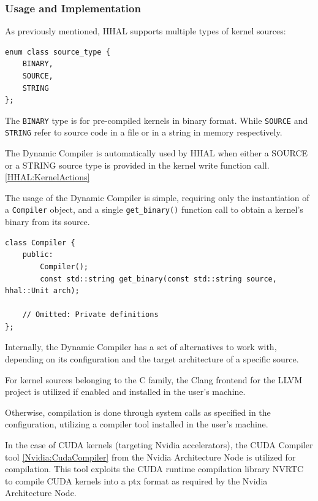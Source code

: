 \subsubsection{Usage and Implementation}

As previously mentioned, HHAL supports multiple types of kernel sources: 

\begin{lstlisting}[style=CStyle, caption=HHAL API - Kernel source types]
enum class source_type {
    BINARY,
    SOURCE,
    STRING
};
\end{lstlisting}

The \texttt{BINARY} type is for pre-compiled kernels in binary format. While \texttt{SOURCE} and \texttt{STRING} refer to source code in a file or in a string in memory respectively.

The Dynamic Compiler is automatically used by HHAL when either a SOURCE or a STRING source type is provided in the kernel write function call. \ref{HHAL:KernelActions}

The usage of the Dynamic Compiler is simple, requiring only the instantiation of a \texttt{Compiler} object, and a single \texttt{get\_binary()} function call to obtain a kernel's binary from its source.

\begin{lstlisting}[style=CStyle, caption=HHAL Dynamic Compiler - Compiler class]
class Compiler {
    public:
        Compiler();
        const std::string get_binary(const std::string source, hhal::Unit arch);

    // Omitted: Private definitions
};
\end{lstlisting}

Internally, the Dynamic Compiler has a set of alternatives to work with, depending on its configuration and the target architecture of a specific source.

For kernel sources belonging to the C family, the Clang frontend for the LLVM project \cite{clang_llvm} is utilized if enabled and installed in the user's machine.

Otherwise, compilation is done through system calls as specified in the configuration, utilizing a compiler tool installed in the user's machine.

In the case of CUDA kernels (targeting Nvidia accelerators), the CUDA Compiler tool \ref{Nvidia:CudaCompiler} from the Nvidia Architecture Node is utilized for compilation. This tool exploits the CUDA runtime compilation library NVRTC to compile CUDA kernels into a ptx format as required by the Nvidia Architecture Node.

